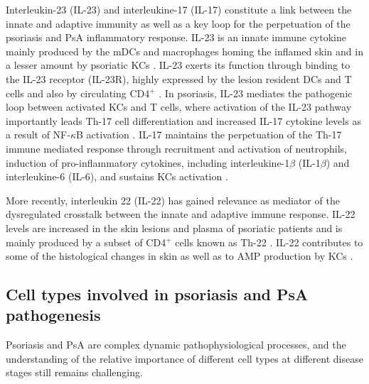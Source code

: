 Interleukin-23 (IL-23) and interleukine-17 (IL-17) constitute a link between the innate and adaptive immunity as well as a key loop for the perpetuation of the psoriasis and PsA inflammatory response. IL-23 is an innate immune cytokine mainly produced by the mDCs and macrophages homing the inflamed skin and in a lesser amount by psoriatic KCs \parencite{Lee2004, Li2018}. IL-23 exerts its function through binding to the IL-23 receptor (IL-23R), highly expressed by the lesion resident DCs and T cells and also by circulating CD4$^+$ \parencite{Tonel2010}. In psoriasis, IL-23 mediates the pathogenic loop between activated KCs and T cells, where activation of the IL-23 pathway importantly leads Th-17 cell differentiation and increased IL-17 cytokine levels as a result of NF-$\kappa$B activation \parencite{McGeachy2009}. %
IL-17 maintains the perpetuation of the Th-17 immune mediated response through recruitment and activation of neutrophils, induction of pro-inflammatory cytokines, including interleukine-1$\beta$ (IL-1$\beta$) and interleukine-6 (IL-6), and sustains KCs activation \parencite{Doyle2012}.

More recently, interleukin 22 (IL-22) has gained relevance as mediator of the dysregulated crosstalk between the innate and adaptive immune response. IL-22 levels are increased in the skin lesions and plasma of psoriatic patients and is mainly produced by a subset of CD4$^+$ cells known as Th-22 \parencite{Wolk2006}. IL-22 contributes to some of the histological changes in skin as well as to AMP production by KCs \parencite{Eyerich2009}.



\subsection{Cell types involved in psoriasis and PsA pathogenesis}

Psoriasis and PsA are complex dynamic pathophysiological processes, and the understanding of the relative importance of different cell types at different disease stages still remains challenging.

